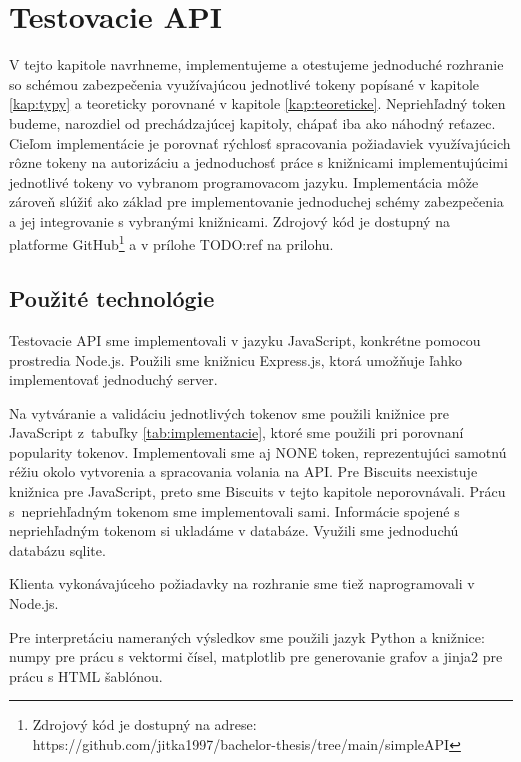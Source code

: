 \chapter{Testovacie API}

\label{kap:prakticke} %

V tejto kapitole navrhneme, implementujeme a otestujeme jednoduché rozhranie so schémou zabezpečenia využívajúcou jednotlivé tokeny popísané v kapitole \ref{kap:typy} a teoreticky porovnané v kapitole \ref{kap:teoreticke}. Nepriehľadný token budeme, narozdiel od prechádzajúcej kapitoly, chápať iba ako náhodný reťazec. Cieľom implementácie je porovnať rýchlosť spracovania požiadaviek využívajúcich rôzne tokeny na autorizáciu a jednoduchosť práce s knižnicami implementujúcimi jednotlivé tokeny vo vybranom programovacom jazyku. Implementácia môže zároveň slúžiť ako základ pre implementovanie jednoduchej schémy zabezpečenia a jej integrovanie s vybranými knižnicami. Zdrojový kód je dostupný na platforme GitHub\footnote{Zdrojový kód je dostupný na adrese:\\ https://github.com/jitka1997/bachelor-thesis/tree/main/simpleAPI} a v prílohe TODO:ref na prilohu.

\section{Použité technológie}

Testovacie API sme implementovali v jazyku JavaScript, konkrétne pomocou prostredia Node.js. Použili sme knižnicu Express.js, ktorá umožňuje ľahko implementovať jednoduchý server.

Na vytváranie a validáciu jednotlivých tokenov sme použili knižnice pre JavaScript z~tabuľky \ref{tab:implementacie}, ktoré sme použili pri porovnaní popularity tokenov. Implementovali sme aj NONE token, reprezentujúci samotnú réžiu okolo vytvorenia a spracovania volania na API. Pre Biscuits neexistuje knižnica pre JavaScript, preto sme Biscuits v tejto kapitole neporovnávali. Prácu s~nepriehľadným tokenom sme implementovali sami. Informácie spojené s nepriehľadným tokenom si ukladáme v databáze. Využili sme jednoduchú databázu sqlite.

Klienta vykonávajúceho požiadavky na rozhranie sme tiež naprogramovali v Node.js.

Pre interpretáciu nameraných výsledkov sme použili jazyk Python a knižnice: numpy pre prácu s vektormi čísel, matplotlib pre generovanie grafov a jinja2 pre prácu s HTML šablónou.


